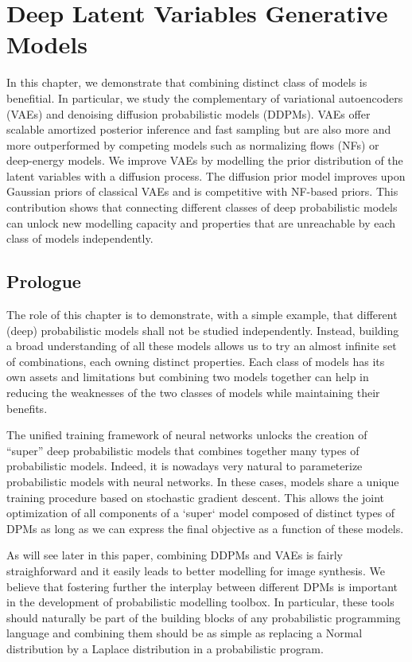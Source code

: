 \chapter{Deep Latent Variables Generative Models}\label{ch:03}

\begin{chapter_outline}

  In this chapter, we demonstrate that combining distinct class of models is benefitial. In particular, we study the complementary of variational autoencoders (VAEs) and denoising diffusion probabilistic models (DDPMs). VAEs offer scalable amortized posterior inference and fast sampling but are also more and more outperformed by competing models such as normalizing flows (NFs) or deep-energy models. We improve VAEs by modelling the prior distribution of the latent variables with a diffusion process. The diffusion prior model improves upon Gaussian priors of classical VAEs and is competitive with NF-based priors.
  This contribution shows that connecting different classes of deep probabilistic models can unlock new modelling capacity and properties that are unreachable by each class of models independently.
\end{chapter_outline}
\section{Prologue}
The role of this chapter is to demonstrate, with a simple example, that different (deep) probabilistic models shall not be studied independently. Instead, building a broad understanding of all these models allows us to try an almost infinite set of combinations, each owning distinct properties. Each class of models has its own assets and limitations but combining two models together can help in reducing the weaknesses of the two classes of models while maintaining their benefits.

The unified training framework of neural networks unlocks the creation of ``super'' deep probabilistic models that combines together many types of probabilistic models. Indeed, it is nowadays very natural to parameterize probabilistic models with neural networks. In these cases, models share a unique training procedure based on stochastic gradient descent. This allows the joint optimization of all components of a `super` model composed of distinct types of DPMs as long as we can express the final objective as a function of these models.

As will see later in this paper, combining DDPMs and VAEs is fairly straighforward and it easily leads to better modelling for image synthesis. We believe that fostering further the interplay between different DPMs is important in the development of probabilistic modelling toolbox. In particular, these tools should naturally be part of the building blocks of any probabilistic programming language and combining them should be as simple as replacing a Normal distribution by a Laplace distribution in a probabilistic program.

